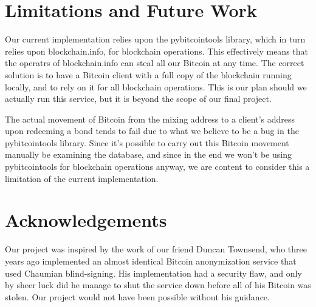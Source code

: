 \documentclass[12pt]{article}
\begin{document}
\section{Limitations and Future Work}
Our current implementation relies upon the pybitcointools library, which in turn relies upon blockchain.info, for blockchain operations.
This effectively means that the operatrs of blockchain.info can steal all our Bitcoin at any time.
The correct solution is to have a Bitcoin client with a full copy of the blockchain running locally, and to rely on it for all blockchain operations.
This is our plan should we actually run this service, but it is beyond the scope of our final project.

The actual movement of Bitcoin from the mixing address to a client's address upon redeeming a bond tends to fail due to what we believe to be a bug in the pybitcointools library. Since it's possible to carry out this Bitcoin movement manually be examining the database, and since in the end we won't be using pybitcointools for blockchain operations anyway, we are content to consider this a limitation of the current implementation.

\section{Acknowledgements}
Our project was inspired by the work of our friend Duncan Townsend, who three years ago implemented an almost identical Bitcoin anonymization service that used Chaumian blind-signing. His implementation had a security flaw, and only by sheer luck did he manage to shut the service down before all of his Bitcoin was stolen. Our project would not have been possible without his guidance.
\end{document}

